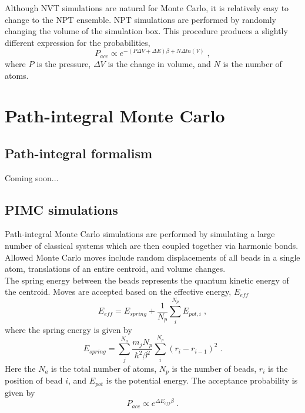 \documentclass[12pt]{report}
\begin{document}
Although NVT simulations are natural for Monte Carlo, it is relatively easy to
change to the NPT ensemble.
NPT simulations are performed by randomly changing the volume of the
simulation box.
This procedure produces a slightly different expression for the probabilities,
\begin{equation}
 P_{acc} \propto e^{-(P\Delta V+\Delta E)\beta+N\Delta ln(V)} \; ,
\end{equation}
where $P$ is the pressure, $\Delta V$ is the change in volume, and $N$ is
the number of atoms.

\section{Path-integral Monte Carlo}

\subsection{Path-integral formalism}

{\color{red}Coming soon...}

\subsection{PIMC simulations}

Path-integral Monte Carlo simulations are performed by simulating a large
number of classical systems which are then coupled together via harmonic
bonds.
Allowed Monte Carlo moves include random displacements of all beads in a
single atom, translations of an entire centroid, and volume changes. \\

The spring energy between the beads represents the quantum kinetic energy of
the centroid.
Moves are accepted based on the effective energy, $E_{eff}$
\begin{equation}
 E_{eff} = E_{spring}+\frac{1}{N_p}\sum_i^{N_p} E_{pot,i} \; ,
\end{equation}
where the spring energy is given by
\begin{equation}
 E_{spring} = \sum_{j}^{N_a} \frac{m_{j}N_{p}}{\hbar^2\beta^2}
              \sum_{i}^{N_p} (r_{i}-r_{i-1})^2  \; .
\end{equation}
Here the $N_a$ is the total number of atoms, $N_p$ is the number of beads,
$r_i$ is the position of bead $i$, and $E_{pot}$ is the potential energy.
The acceptance probability is given by
\begin{equation}
 P_{acc} \propto e^{\Delta E_{eff}\beta} \; .
\end{equation}
\end{document}
